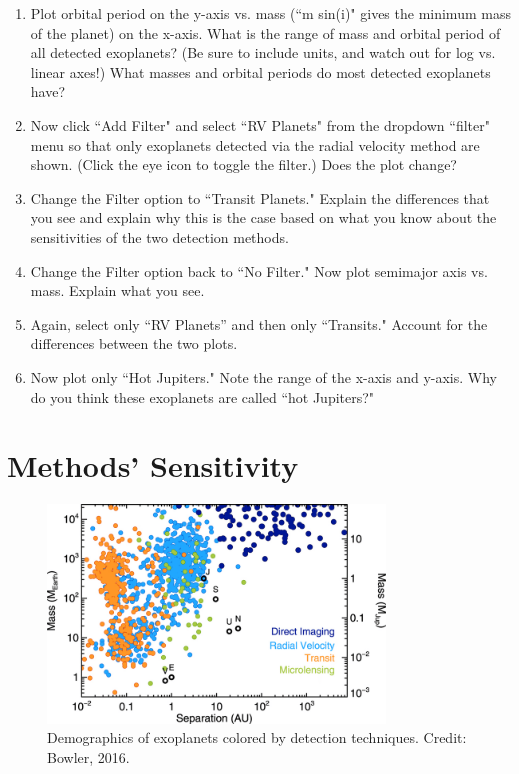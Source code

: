 \documentclass[11pt]{article}%
\begin{document}
\begin{enumerate}
\item Plot orbital period on the y-axis vs. mass (``m sin(i)" gives the minimum mass of the planet) on the x-axis.  What is the range of mass and orbital period of all detected exoplanets?  (Be sure to include units, and watch out for log vs. linear axes!)  What masses and orbital periods do most detected exoplanets have?
\item Now click ``Add Filter" and select ``RV Planets" from the dropdown ``filter" menu so that only exoplanets detected via the radial velocity method are shown. (Click the eye icon to toggle the filter.)  Does the plot change?  
\item Change the Filter option to ``Transit Planets."  Explain the differences that you see and explain why this is the case based on what you know about the sensitivities of the two detection methods.
\item Change the Filter option back to ``No Filter."  Now plot semimajor axis vs. mass.  Explain what you see.
\item Again, select only ``RV Planets'' and then only ``Transits."  Account for the differences between the two plots.
\item Now plot only ``Hot Jupiters."  Note the range of the x-axis and y-axis.  Why do you think these exoplanets are called ``hot Jupiters?"
\end{enumerate}

\section{Methods' Sensitivity}

\begin{figure}[h!]
    \centering
    \includegraphics[width=0.8\textwidth]{Exoplanet Demographic Techniques.png}
    \caption{Demographics of exoplanets colored by detection techniques. Credit: Bowler, 2016.}
    \label{fig:techniques}
\end{figure}
\end{document}
